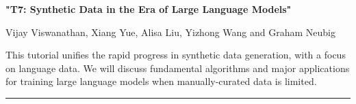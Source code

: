 \begin{center}
    \Large{\textbf{"T7: Synthetic Data in the Era of Large Language Models"}\\}
    \par\bigskip
    \large{Vijay Viswanathan, Xiang Yue, Alisa Liu, Yizhong Wang and Graham Neubig}\\
    \par\bigskip

\end{center}

This tutorial unifies the rapid progress in synthetic data generation, with a focus on language data. 
We will discuss fundamental algorithms and major applications for training large language models when manually-curated data is limited.

\begin{center}
    \noindent\rule{200px}{1pt}
\end{center}
